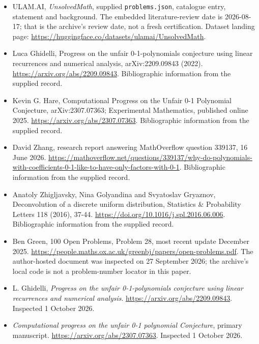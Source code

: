 \documentclass[11pt,a4paper]{article}
\begin{document}
{\small

\begin{itemize}

\item[\hypertarget{source:statement:1}{S1}] ULAM.AI, \emph{UnsolvedMath}, supplied \texttt{problems.json}, catalogue entry, statement and background. The embedded literature-review date is 2026-08-17; that is the archive’s review date, not a fresh certification. Dataset landing page: \url{https://huggingface.co/datasets/ulamai/UnsolvedMath}.

\item[\hypertarget{source:statement:2}{S2}] Luca Ghidelli, Progress on the unfair 0-1-polynomials conjecture using linear recurrences and numerical analysis, arXiv:2209.09843 (2022). \url{https://arxiv.org/abs/2209.09843}. Bibliographic information from the supplied record.

\item[\hypertarget{source:statement:3}{S3}] Kevin G. Hare, Computational Progress on the Unfair 0-1 Polynomial Conjecture, arXiv:2307.07363; Experimental Mathematics, published online 2025. \url{https://arxiv.org/abs/2307.07363}. Bibliographic information from the supplied record.

\item[\hypertarget{source:statement:4}{S4}] David Zhang, research report answering MathOverflow question 339137, 16 June 2026. \url{https://mathoverflow.net/questions/339137/why-do-polynomials-with-coefficients-0-1-like-to-have-only-factors-with-0-1}. Bibliographic information from the supplied record.

\item[\hypertarget{source:statement:5}{S5}] Anatoly Zhigljavsky, Nina Golyandina and Svyatoslav Gryaznov, Deconvolution of a discrete uniform distribution, Statistics \& Probability Letters 118 (2016), 37-44. \url{https://doi.org/10.1016/j.spl.2016.06.006}. Bibliographic information from the supplied record.

\item[\hypertarget{source:statement:6}{S6}] Ben Green, 100 Open Problems, Problem 28, most recent update December 2025. \url{https://people.maths.ox.ac.uk/greenbj/papers/open-problems.pdf}. The author-hosted document was inspected on 27 September 2026; the archive’s local code is not a problem-number locator in this paper.

\item[E1] L. Ghidelli, \emph{Progress on the unfair 0-1-polynomials conjecture using linear recurrences and numerical analysis}. \url{https://arxiv.org/abs/2209.09843}. Inspected 1 October 2026.

\item[E2] \emph{Computational progress on the unfair 0-1 polynomial Conjecture}, primary manuscript. \url{https://arxiv.org/abs/2307.07363}. Inspected 1 October 2026.

\end{itemize}

}

\label{end:statement}
\end{document}
